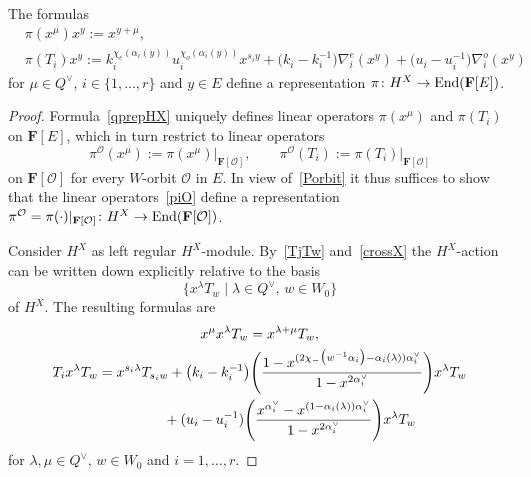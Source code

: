 \begin{Theorem}\label{theoremH}
The formulas
\begin{align}
&\pi(x^\mu)x^y:=x^{y+\mu},\nonumber\\
&\pi(T_i)x^y:=k_i^{\chi_e(\alpha_i(y))}u_i^{\chi_o(\alpha_i(y))}x^{s_iy}+\bigl(k_i-k_i^{-1}\bigr)\nabla_i^e(x^y)+\bigl(u_i-u_i^{-1}\bigr)\nabla_i^o(x^y)\label{qprepHX}
\end{align}
for $\mu\in Q^\vee$, $i\in\{1,\dots,r\}$ and $y\in E$
define a representation $\pi\colon H^X\rightarrow\textup{End}(\mathbf{F}[E])$.
\end{Theorem}
\begin{proof}
Formula~\eqref{qprepHX} uniquely defines linear operators $\pi(x^\mu)$ and $\pi(T_i)$ on $\mathbf{F}[E]$, which in turn restrict to linear operators
\begin{equation}\label{piO}
\pi^{\mathcal{O}}(x^\mu):=\pi(x^\mu)\vert_{\mathbf{F}[\mathcal{O}]},\qquad \pi^{\mathcal{O}}(T_i):=\pi(T_i)\vert_{\mathbf{F}[\mathcal{O}]}
\end{equation}
on $\mathbf{F}[\mathcal{O}]$ for every $W$-orbit $\mathcal{O}$ in $E$. In view of~\eqref{Porbit} it thus suffices to show that the linear operators~\eqref{piO} define a representation $\pi^{\mathcal{O}}=\pi(\cdot)\vert_{\mathbf{F}[\mathcal{O}]}\colon H^X\rightarrow\textup{End}(\mathbf{F}[\mathcal{O}])$.

Consider $H^X$ as left regular $H^X$-module. By~\eqref{TjTw} and~\eqref{crossX} the $H^X$-action can be written down explicitly relative to the basis
\[
\bigl\{x^\lambda T_w\mid \lambda\in Q^\vee,\, w\in W_0\bigr\}
\]
of $H^X$. The resulting formulas are
\begin{gather}
x^\mu x^\lambda T_w=x^{\lambda+\mu}T_w,\nonumber\\
T_ix^\lambda T_w=x^{s_i\lambda}T_{s_iw}+\bigl(k_i-k_i^{-1}\bigr)\Biggl(\frac{1-x^{(2\chi_-\bigl(w^{-1}\alpha_i\bigr)-\alpha_i(\lambda))\alpha_i^\vee}}{1-x^{2\alpha_i^\vee}}\Biggr)x^\lambda T_w\nonumber\\
\hphantom{T_ix^\lambda T_w=}{}
+(u_i-u_i^{-1})\Biggl(\frac{x^{\alpha_i^\vee}-x^{(1-\alpha_i(\lambda))\alpha_i^\vee}}{1-x^{2\alpha_i^\vee}}\Biggr)x^{\lambda}T_w
\label{regularHX}
\end{gather}
for $\lambda,\mu\in Q^\vee$, $w\in W_0$ and $i=1,\dots,r$.


\end{proof}
